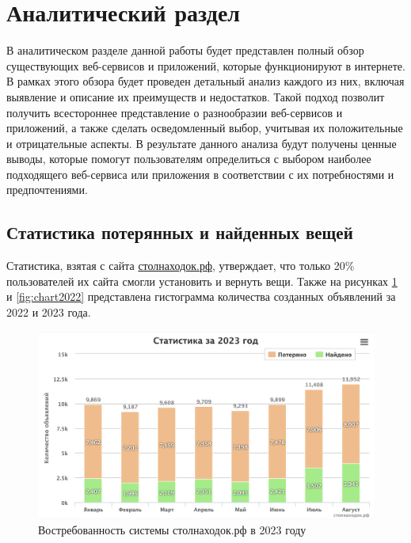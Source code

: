 \documentclass{mirea}
\begin{document}
\section{Аналитический раздел}

В аналитическом разделе данной работы будет представлен полный обзор существующих веб-сервисов и приложений, которые функционируют в интернете. В рамках этого обзора будет проведен детальный анализ каждого из них, включая выявление и описание их преимуществ и недостатков. Такой подход позволит получить всестороннее представление о разнообразии веб-сервисов и приложений, а также сделать осведомленный выбор, учитывая их положительные и отрицательные аспекты. В результате данного анализа будут получены ценные выводы, которые помогут пользователям определиться с выбором наиболее подходящего веб-сервиса или приложения в соответствии с их потребностями и предпочтениями.

\subsection{Статистика потерянных и найденных вещей}

Статистика, взятая с сайта \href{http://xn--80aisbkedbuk1b.xn--p1ai/}{столнаходок.рф}, утверждает, что только 20\% пользователей их сайта смогли установить и вернуть вещи. Также на рисунках \ref{fig:chart2023} и \ref{fig:chart2022} представлена гистограмма количества созданных объявлений за 2022 и 2023 года.

\begin{figure}[htb]
	\centering
	\includegraphics[width=.95\textwidth]{images/chart2023}
	\parskip=6pt
	\caption{Востребованность системы столнаходок.рф в 2023 году}
	\label{fig:chart2023}
\end{figure}
\end{document}
